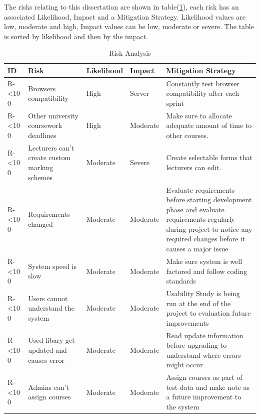 \documentclass[12pt]{article}  %
\newcommand{\rid}[1]{\centering #1-\ifnum\value{requirement}<10 0\fi\arabic{requirement} \stepcounter{requirement}}
\begin{document}
The risks relating to this dissertation are shown in table(\ref{table:risks}), each risk has an associated Likelihood, Impact and a Mitigation Strategy. Likelihood values are low, moderate and high, Impact values can be low, moderate or severe. The table is sorted by likelihood and then by the impact.

\begin{spacing}{1.5}
\begin{longtable}{|p{}|p{}|p{}|p{}|p{}|}
\caption{Risk Analysis} \label{table:risks} \\ \hline
\textbf{ID} & \textbf{Risk} & \textbf{Likelihood} & \textbf{Impact } & \textbf{Mitigation Strategy}\\
\hline

\rid{R} & Browsers compatibility & High & Server & Constantly test browser compatibility after each sprint\\ \hline

\rid{R} & Other university coursework deadlines & High & Moderate & Make sure to allocate adequate amount of time to other courses.\\ \hline


\rid{R} & Lecturers can’t create custom marking schemes & Moderate & Severe & Create selectable forms that lecturers can edit.\\ \hline

\rid{R} & Requirements changed & Moderate & Moderate & Evaluate requirements before starting development phase and evaluate requirements regularly during project to notice any required changes before it causes a major issue \\ \hline

\rid{R} & System speed is slow & Moderate & Moderate & Make sure system is well factored and follow coding standards \\ \hline

\rid{R} & Users cannot understand the system & Moderate & Moderate & Usability Study is being run at the end of the project to evaluation future improvements\\ \hline

\rid{R} & Used libary get updated and causes error & Moderate & Moderate & Read update information before upgrading to understand where errors might occur\\ \hline

\rid{R} & Admins can’t assign courses & Moderate & Moderate & Assign courses as part of test data and make note as a future improvement to the system  \\ \hline


\end{longtable}
\end{spacing}
\end{document}
